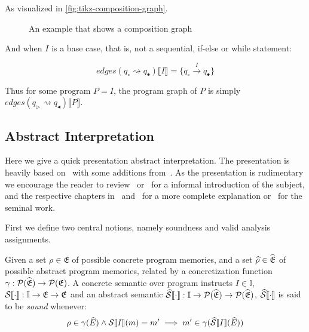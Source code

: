 As visualized in \autoref{fig:tikz-composition-graph}.

\begin{figure}
    \center
    
    \caption{An example that shows a composition graph}
    \label{fig:tikz-composition-graph}
\end{figure}

And when $I$ is a base case, that is, not a sequential, if-else or while statement:

\begin{equation}
    edges(q_\circ \rightsquigarrow q_\bullet) \llbracket I \rrbracket = \{q_\circ \xrightarrow{I} q_\bullet\}\label{eq:equation11}
\end{equation}

Thus for some program $P = I$, the program graph of $P$ is simply $edges(q_\triangleright \rightsquigarrow q_\blacktriangleleft)\llbracket P \rrbracket$.

\subsection{Abstract Interpretation}\label{subsec:abstract-interpretation}

Here we give a quick presentation abstract interpretation.
The presentation is heavily based on~\cite{nielson_formal_2019} with some additions from~\cite{moller_statitc_nodate}.
As the presentation is rudimentary we encourage the reader to review~\cite{noauthor_abstract_nodate} or~\cite{cousot_abstract_1996} for a informal introduction of the subject, and the respective chapters in~\cite{nielson_formal_2019} and~\cite{moller_statitc_nodate} for a more complete explanation or~\cite{cousot_abstract_1977} for the seminal work.

First we define two central notions, namely soundness and valid analysis assignments.

\begin{definition}
    Given a set $\rho \in \mathfrak{E}$ of possible concrete program memories, and a set $\widehat{\rho} \in \widehat{\mathfrak{E}}$ of possible abstract program memories, related by a concretization function $\gamma : \mathcal{P}(\widehat{\mathfrak{E}}) \rightarrow \mathcal{P}(\mathfrak{E})$.
    A concrete semantic over program instructs $I \in \mathbb{I}$, $\mathcal{S} \llbracket \cdot \rrbracket : \mathbb{I} \rightarrow \mathfrak{E} \rightarrow \mathfrak{E}$ and an abstract semantic $\widehat{\mathcal{S}} \llbracket \cdot \rrbracket : \mathbb{I} \rightarrow \mathcal{P}(\widehat{\mathfrak{E}}) \rightarrow \mathcal{P}(\widehat{\mathfrak{E}})$, $\widehat{\mathcal{S}} \llbracket \cdot \rrbracket$ is said to be \emph{sound} whenever:
    \begin{equation}
        \rho \in \concrete(\ab{E}) \land \sem{I}(m) = m' \implies m' \in \concrete(\abssem{I}(\ab{E}))\label{eq:equation12}
    \end{equation}
\end{definition}

